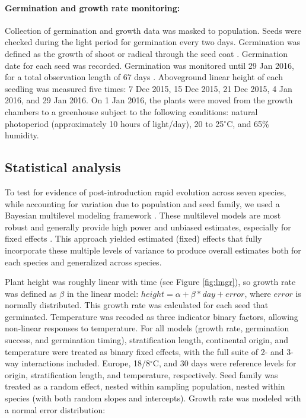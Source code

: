 \documentclass[11pt]{article}\usepackage[]{graphicx}\usepackage[]{color}
\begin{document}
	\paragraph{Germination and growth rate monitoring:}  Collection of germination and growth data was masked to population. Seeds were checked during the light period for germination every two days. Germination was defined as the growth of shoot or radical through the seed coat \parencite{Baskin1998,Popay1970}. Germination date for each seed was recorded.  Germination was monitored until 29 Jan 2016, for a total observation length of 67 days  \parencite[this is longer than the typical two-week germination trials according to][]{Baskin1998,Wulff1994}. Aboveground linear height of each seedling was measured five times: 7 Dec 2015, 15 Dec 2015, 21 Dec 2015, 4 Jan 2016, and 29 Jan 2016. On 1 Jan 2016, the plants were moved from the growth chambers to a greenhouse subject to the following conditions: natural photoperiod (approximately 10 hours of light/day), 20 to 25$^\circ$C, and 65\% humidity.
	\subsection{Statistical analysis} 
	To test for evidence of post-introduction rapid evolution across seven species, while accounting for variation due to population and seed family, we used a Bayesian multilevel modeling framework \parencite{Carpenter2017}. These multilevel models are most
robust and generally provide high power and unbiased estimates, especially for fixed effects \parencite{Paccagnella2011}. This approach yielded estimated (fixed) effects that fully incorporate these multiple levels of variance to produce overall estimates both for each species and generalized across species. 

Plant height was roughly linear with time (see Figure \ref{fig:lmgr}), so growth rate was defined as $\beta$ in the linear model: $height = \alpha + \beta*day + error $, where $error$ is normally distributed. This growth rate was calculated for each seed that germinated. Temperature was recoded as three indicator binary factors, allowing non-linear responses to temperature. For all models (growth rate, germination success, and germination timing), stratification length, continental origin, and temperature were treated as binary fixed effects, with the full suite of 2- and 3-way interactions included. Europe, 18/8$^\circ$C, and 30 days were reference levels for origin, stratification length, and temperature, respectively. Seed family was treated as a random effect, nested within sampling population, nested within species (with both random slopes and intercepts). Growth rate was modeled with a normal error distribution: 
\end{document}
